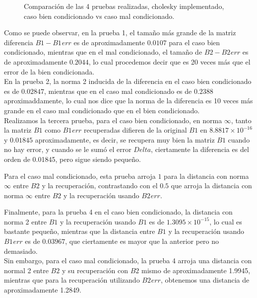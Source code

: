 \documentclass[letterpaper]{article}
\newcommand{\1}{\mathds{1}}
\theoremstyle{definition}
\theoremstyle{definition}
\theoremstyle{definition}
\theoremstyle{definition}
\theoremstyle{definition}
\begin{document}
\begin{enumerate}
\begin{enumerate}
\begin{figure}[h]
            \caption{Comparación de las 4 pruebas realizadas, cholesky implementado, caso bien condicionado vs caso mal condicionado.}
        \end{figure}
        Como se puede observar, en la prueba 1, el tamaño más grande de la matriz diferencia $B1-B1_{}err$ es de aproximadamente $0.0107$ para
        el caso bien condicionado, mientras que en el mal condicionado, el tamaño de $B2-B2_{}err$ es de aproximadamente $0.2044$, lo cual procedemos
        decir que es 20 veces más que el error de la bien condicionada.\\

        En la prueba 2, la norma 2 inducida de la diferencia en el caso bien condicionado es de $0.02847$, mientras que 
        en el caso mal condicionado es de $0.2388$ aproximaddamente, lo cual nos dice que la norma de la diferencia es 10 veces
        más grande en el caso mal condicionado que en el bien condicionado.\\

        Realizamos la tercera prueba, para el caso bien condicionado, en norma $\infty$, 
        tanto la matriz $B1$ como $B1_{}err$ recuperadas difieren de la original $B1$ en $8.8817\times 10^{-16}$ y $0.01845$ aproximadamente,
        es decir, se recupera muy bien la matriz $B1$ cuando no hay error, y cuando se le sumó el error $Delta$, ciertamente la diferencia es
        del orden de 0.01845, pero sigue siendo pequeño.
        \newline

        Para el caso mal condicionado, esta prueba arroja $1$ para la distancia con norma $\infty$ entre $B2$ y la recuperación,
        contrastando con el $0.5$ que arroja la distancia con norma $\infty$ entre $B2$ y la recuperación usando $B2_{}err$.
        \newline

        Finalmente, para la prueba 4 en el caso bien condicionado, la distancia con norma 2 entre $B1$ y la recuperación usando $B1$ es
        de $1.3095\times10^{-15}$, lo cual es bastante pequeño, mientras que la distancia entre $B1$ y la recuperación usando $B1_{}err$
        es de $0.03967$, que ciertamente es mayor que la anterior pero no demasiado.\\

        Sin embargo, para el caso mal condicionado, la prueba 4 arroja una distancia con normal 2 entre $B2$ y su recuperación con $B2$ mismo
        de aproximadamente 1.9945, mientras que para la recuperación utilizando $B2_{}err$, obtenemos una distancia de 
        aproximadamente 1.2849.
        \newline


\end{enumerate}
\end{enumerate}
\end{document}
